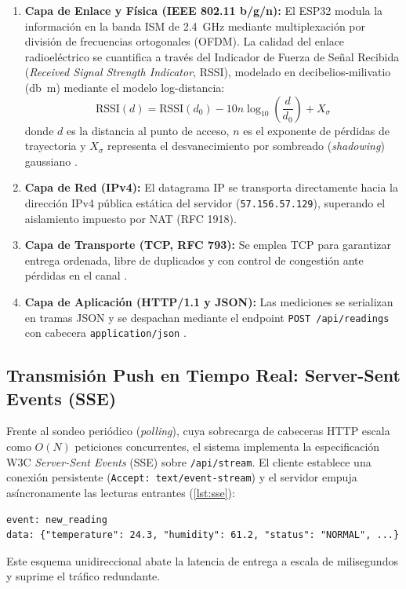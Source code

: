 \documentclass[conference]{IEEEtran}
\begin{document}
\begin{enumerate}
    \item \textbf{Capa de Enlace y Física (IEEE 802.11 b/g/n):} El ESP32 modula la información en la banda ISM de \SI{2.4}{\giga\hertz} mediante multiplexación por división de frecuencias ortogonales (OFDM). La calidad del enlace radioeléctrico se cuantifica a través del Indicador de Fuerza de Señal Recibida (\textit{Received Signal Strength Indicator}, RSSI), modelado en decibelios-milivatio (\si{\decibel m}) mediante el modelo log-distancia:
    \begin{equation}
        \text{RSSI}(d) = \text{RSSI}(d_0) - 10 n \log_{10}\left(\frac{d}{d_0}\right) + X_\sigma
        \label{eq:rssi}
    \end{equation}
    donde $d$ es la distancia al punto de acceso, $n$ es el exponente de pérdidas de trayectoria y $X_\sigma$ representa el desvanecimiento por sombreado (\textit{shadowing}) gaussiano \cite{forouzan2013}.
    
    \item \textbf{Capa de Red (IPv4):} El datagrama IP se transporta directamente hacia la dirección IPv4 pública estática del servidor (\texttt{57.156.57.129}), superando el aislamiento impuesto por NAT (RFC 1918).
    
    \item \textbf{Capa de Transporte (TCP, RFC 793):} Se emplea TCP para garantizar entrega ordenada, libre de duplicados y con control de congestión ante pérdidas en el canal \cite{rfc793}.
    
    \item \textbf{Capa de Aplicación (HTTP/1.1 y JSON):} Las mediciones se serializan en tramas JSON y se despachan mediante el endpoint \texttt{POST /api/readings} con cabecera \texttt{application/json} \cite{rfc7230, rfc8259}.
\end{enumerate}

\subsection{Transmisión Push en Tiempo Real: Server-Sent Events (SSE)}
Frente al sondeo periódico (\textit{polling}), cuya sobrecarga de cabeceras HTTP escala como $O(N)$ peticiones concurrentes, el sistema implementa la especificación W3C \textit{Server-Sent Events} (SSE) sobre \texttt{/api/stream}. El cliente establece una conexión persistente (\texttt{Accept: text/event-stream}) y el servidor empuja asíncronamente las lecturas entrantes (\autoref{lst:sse}):
{\centering
\begin{lstlisting}[caption={Estructura de transmisión SSE emitida hacia los clientes web.}, label={lst:sse}]
event: new_reading
data: {"temperature": 24.3, "humidity": 61.2, "status": "NORMAL", ...}
\end{lstlisting}
\par}
Este esquema unidireccional abate la latencia de entrega a escala de milisegundos y suprime el tráfico redundante.
\end{document}
